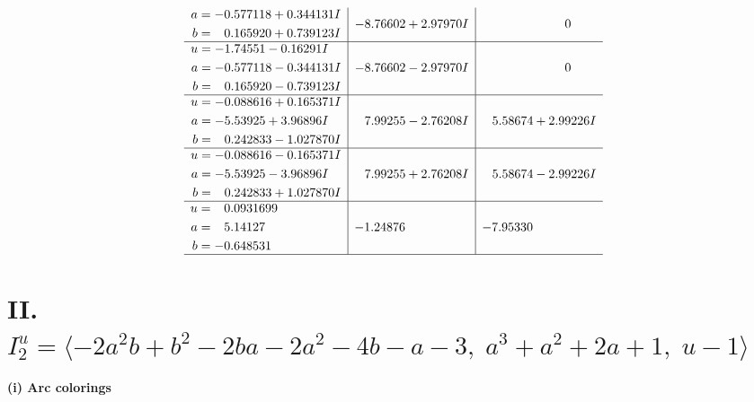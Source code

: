 \documentclass[1p]{elsarticle_modified}
\theoremstyle{definition}
\begin{document}
$$\begin{array}{c|c|c}
\begin{aligned}
a &= -0.577118 + 0.344131 I \\
b &= \phantom{-}0.165920 + 0.739123 I\end{aligned}
 & -8.76602 + 2.97970 I & \phantom{-0.000000 } 0 \\ \hline\begin{aligned}
u &= -1.74551 - 0.16291 I \\
a &= -0.577118 - 0.344131 I \\
b &= \phantom{-}0.165920 - 0.739123 I\end{aligned}
 & -8.76602 - 2.97970 I & \phantom{-0.000000 } 0 \\ \hline\begin{aligned}
u &= -0.088616 + 0.165371 I \\
a &= -5.53925 + 3.96896 I \\
b &= \phantom{-}0.242833 - 1.027870 I\end{aligned}
 & \phantom{-}7.99255 - 2.76208 I & \phantom{-}5.58674 + 2.99226 I \\ \hline\begin{aligned}
u &= -0.088616 - 0.165371 I \\
a &= -5.53925 - 3.96896 I \\
b &= \phantom{-}0.242833 + 1.027870 I\end{aligned}
 & \phantom{-}7.99255 + 2.76208 I & \phantom{-}5.58674 - 2.99226 I \\ \hline\begin{aligned}
u &= \phantom{-}0.0931699\phantom{ +0.000000I} \\
a &= \phantom{-}5.14127\phantom{ +0.000000I} \\
b &= -0.648531\phantom{ +0.000000I}\end{aligned}
 & -1.24876\phantom{ +0.000000I} & -7.95330\phantom{ +0.000000I}\\
 \hline 
 \end{array}$$\newpage\newpage\renewcommand{\arraystretch}{1}
\centering \section*{II. $I^u_{2}= \langle -2 a^2 b+b^2-2 b a-2 a^2-4 b- a-3,\;a^3+a^2+2 a+1,\;u-1 \rangle$}
\flushleft \textbf{(i) Arc colorings}\\
\end{document}
